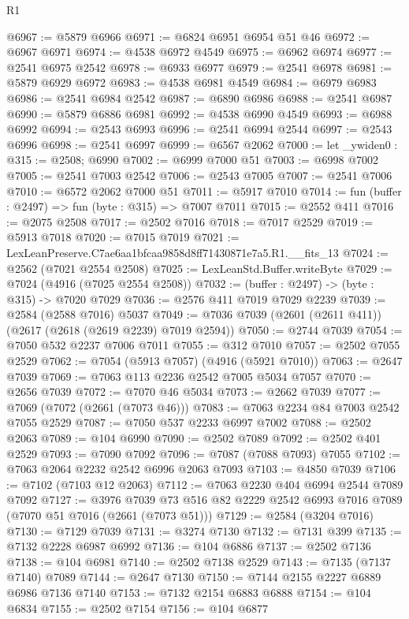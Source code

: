 \begin{lexlean}{R1}
\begin{coremodule}
@6967 := @5879 @6966
@6971 := @6824 @6951 @6954 @51 @46
@6972 := @6967 @6971
@6974 := @4538 @6972 @4549
@6975 := @6962 @6974
@6977 := @2541 @6975 @2542
@6978 := @6933 @6977
@6979 := @2541 @6978
@6981 := @5879 @6929 @6972
@6983 := @4538 @6981 @4549
@6984 := @6979 @6983
@6986 := @2541 @6984 @2542
@6987 := @6890 @6986
@6988 := @2541 @6987
@6990 := @5879 @6886 @6981
@6992 := @4538 @6990 @4549
@6993 := @6988 @6992
@6994 := @2543 @6993
@6996 := @2541 @6994 @2544
@6997 := @2543 @6996
@6998 := @2541 @6997
@6999 := @6567 @2062
@7000 := let _ywiden0 : @315 := @2508; @6990
@7002 := @6999 @7000 @51
@7003 := @6998 @7002
@7005 := @2541 @7003 @2542
@7006 := @2543 @7005
@7007 := @2541 @7006
@7010 := @6572 @2062 @7000 @51
@7011 := @5917 @7010
@7014 := fun (buffer : @2497) => fun (byte : @315) => @7007 @7011
@7015 := @2552 @411
@7016 := @2075 @2508
@7017 := @2502 @7016
@7018 := @7017 @2529
@7019 := @5913 @7018
@7020 := @7015 @7019
@7021 := LexLeanPreserve.C7ae6aa1bfcaa9858d8ff71430871e7a5.R1.__fits_13
@7024 := @2562 (@7021 @2554 @2508)
@7025 := LexLeanStd.Buffer.writeByte
@7029 := @7024 (@4916 (@7025 @2554 @2508))
@7032 := (buffer : @2497) -> (byte : @315) -> @7020 @7029
@7036 := @2576 @411 @7019 @7029 @2239
@7039 := @2584 (@2588 @7016) @5037
@7049 := @7036 @7039 (@2601 (@2611 @411)) (@2617 (@2618 (@2619 @2239) @7019 @2594))
@7050 := @2744 @7039
@7054 := @7050 @532 @2237 @7006 @7011
@7055 := @312 @7010
@7057 := @2502 @7055 @2529
@7062 := @7054 (@5913 @7057) (@4916 (@5921 @7010))
@7063 := @2647 @7039
@7069 := @7063 @113 @2236 @2542 @7005 @5034 @7057
@7070 := @2656 @7039
@7072 := @7070 @46 @5034
@7073 := @2662 @7039
@7077 := @7069 (@7072 (@2661 (@7073 @46)))
@7083 := @7063 @2234 @84 @7003 @2542 @7055 @2529
@7087 := @7050 @537 @2233 @6997 @7002
@7088 := @2502 @2063
@7089 := @104 @6990
@7090 := @2502 @7089
@7092 := @2502 @401 @2529
@7093 := @7090 @7092
@7096 := @7087 (@7088 @7093) @7055
@7102 := @7063 @2064 @2232 @2542 @6996 @2063 @7093
@7103 := @4850 @7039
@7106 := @7102 (@7103 @12 @2063)
@7112 := @7063 @2230 @404 @6994 @2544 @7089 @7092
@7127 := @3976
    @7039
    @73
    @516
    @82
    @2229
    @2542
    @6993
    @7016
    @7089
    (@7070 @51 @7016 (@2661 (@7073 @51)))
@7129 := @2584 (@3204 @7016)
@7130 := @7129 @7039
@7131 := @3274 @7130
@7132 := @7131 @399
@7135 := @7132 @2228 @6987 @6992
@7136 := @104 @6886
@7137 := @2502 @7136
@7138 := @104 @6981
@7140 := @2502 @7138 @2529
@7143 := @7135 (@7137 @7140) @7089
@7144 := @2647 @7130
@7150 := @7144 @2155 @2227 @6889 @6986 @7136 @7140
@7153 := @7132 @2154 @6883 @6888
@7154 := @104 @6834
@7155 := @2502 @7154
@7156 := @104 @6877

\end{coremodule}
\end{lexlean}
